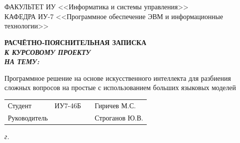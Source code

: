 \begin{titlepage}
	\vspace{-4.2mm}
	\vhrulefill{0.2mm} \\
	\vspace{-6mm}
	\vhrulefill{0.9mm} \\
	\vspace{2.8mm}
	
	{
		\small \raggedright
		ФАКУЛЬТЕТ ИУ <<Информатика и системы управления>> \\
		\vspace{3.3mm}
		КАФЕДРА ИУ-7 <<Программное обеспечение ЭВМ и информационные технологии>> \\
	}
	
	\vspace{20.8mm}
	
	{
		\LARGE \bfseries
		РАСЧЁТНО-ПОЯСНИТЕЛЬНАЯ ЗАПИСКА\\
	}
	\vspace{9mm}
	{
		\Large \bfseries \itshape
		К КУРСОВОМУ ПРОЕКТУ \\
		\vspace{2mm}
		НА ТЕМУ: \\
	}
	
	\vspace{10mm}
	
	{
		\Large 
		Программное решение на основе искусственного интеллекта для разбиения сложных вопросов на простые с использованием больших языковых моделей
	}
	
	\vfill
	
	\begin{tabular}{p{}PPT}
		Студент & ИУ7-46Б & \uline{} & Гиричев М.С. \\
		Руководитель & ~ & \uline{} & Строганов Ю.В. \\
	\end{tabular}
	
	\vspace{14mm}
	
	\textit{{\the\year} г.}
	
\end{titlepage}